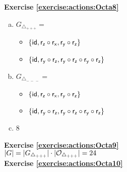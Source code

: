 \noindent\textbf{Exercise \ref{exercise:actions:Octa8}}
\begin{enumerate}[(a)]
\item 
$G_{\triangle_{+ + +}} =$
	\begin{itemize}
	\item
	$\{\sf{id}, r_z \circ r_x, r_y \circ r_z\}$
	
	\item
	$\{\sf{id}, r_y \circ r_z, r_y \circ r_z \circ r_y \circ r_z\}$
	\end{itemize}
	
\item 
$G_{\triangle_{ -~-~-}} =$
	\begin{itemize}
	\item
	$\{\sf{id}, r_z \circ r_x, r_y \circ r_z\}$
	
	\item
	$\{\sf{id}, r_y \circ r_z, r_y \circ r_z \circ r_y \circ r_z\}$
	\end{itemize}
	
\item 
8
\end{enumerate}

\noindent\textbf{Exercise \ref{exercise:actions:Octa9}}
\\
$|G| = |G_{\triangle_{+ + +}}| \cdot |{\cal O}_{\triangle_{+ + +}}| = 24$
\\


\noindent\textbf{Exercise \ref{exercise:actions:Octa10}}
% 
%


